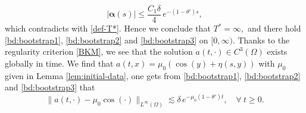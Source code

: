 \documentclass[12pt]{amsart}
\numberwithin{equation}{section}
\numberwithin{equation}{section}
\begin{document}
         \begin{equation} 
 |\boldsymbol\alpha(s)| \leq  \frac{C_1\delta}{4}\,e^{-(1-\theta')s},
    \end{equation}
    which contradicts with \eqref{def-T*}.   Hence we conclude that $T^*=\infty,$ and there hold   \eqref{bd:bootstrap1},   \eqref{bd:bootstrap2} and  \eqref{bd:bootstrap3} on $[0,  \infty)$.    Thanks to the regularity criterion \eqref{BKM},  we see that the solution $a(t,  \cdot)\in C^3(\Omega)$ exists globally in time.  We find that $a(t, x)=\mu_0(\cos(y)+\eta(s, y))$ with  $\mu_0$ given in   Lemma \ref{lem:initial-data},    one  gets from  \eqref{bd:bootstrap1},   \eqref{bd:bootstrap2} and  \eqref{bd:bootstrap3} that 
    \begin{equation}
\|a(t, \cdot)-\mu_0 \cos(\cdot)\|_{L^\infty(\Omega)}\lesssim \delta\, e^{-\mu_0(1-\theta')t},\quad \forall~t\geq0.
\end{equation}
    
\end{document}
